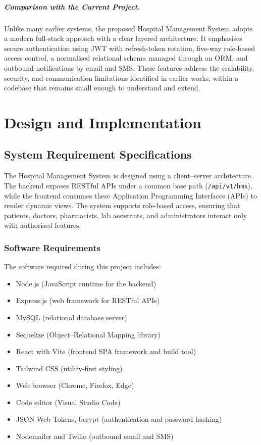 \documentclass[12pt,a4paper]{report}
\begin{document}
\paragraph{Comparison with the Current Project.}
Unlike many earlier systems, the proposed Hospital Management System adopts a modern
full-stack approach with a clear layered architecture. It emphasises secure
authentication using JWT with refresh-token rotation, five-way role-based access
control, a normalised relational schema managed through an ORM, and outbound
notifications by email and SMS. These features address the scalability, security, and
communication limitations identified in earlier works, within a codebase that remains
small enough to understand and extend.

\chapter{Design and Implementation}

\section{System Requirement Specifications}
The Hospital Management System is designed using a client--server architecture. The
backend exposes RESTful APIs under a common base path (\texttt{/api/v1/hms}), while the
frontend consumes these Application Programming Interfaces (APIs) to render dynamic
views. The system supports role-based access, ensuring that patients, doctors,
pharmacists, lab assistants, and administrators interact only with authorised features.

\subsection{Software Requirements}
The software required during this project includes:
\begin{itemize}[leftmargin=1.4em, itemsep=1pt]
  \item Node.js (JavaScript runtime for the backend)
  \item Express.js (web framework for RESTful APIs)
  \item MySQL (relational database server)
  \item Sequelize (Object--Relational Mapping library)
  \item React with Vite (frontend SPA framework and build tool)
  \item Tailwind CSS (utility-first styling)
  \item Web browser (Chrome, Firefox, Edge)
  \item Code editor (Visual Studio Code)
  \item JSON Web Tokens, bcrypt (authentication and password hashing)
  \item Nodemailer and Twilio (outbound email and SMS)
\end{itemize}
\end{document}
